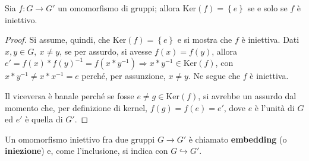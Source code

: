 \documentclass[11pt, a4paper]{scrartcl}
\theoremstyle{definition}
\numberwithin{esempio}{section}
\theoremstyle{definition}
\numberwithin{obs}{section}
\numberwithin{nota}{section}
\numberwithin{equation}{subsection}
\begin{document}
\begin{prop}
	{}{}
	Sia $f : G\to G'$ un omomorfismo di gruppi; allora $\mathrm{Ker} (f) = \left\{ e \right\} $ se e solo se $f$ \`e iniettivo.
	\begin{proof}
		Si assume, quindi, che $\mathrm{Ker} (f) = \left\{ e \right\} $ e si mostra che $f$ \`e iniettiva. Dati $x,y \in G, \ x\neq y$, se per assurdo, si avesse $f(x) = f(y)$, allora $ e'=  f(x) * f(y)^{-1} = f(x * y^{-1} )\Rightarrow x*y^{-1}  \in \mathrm{Ker} (f)$, con $x*y^{-1}  \neq x * x^{-1} = e$ perch\'e, per assunzione, $x \neq y$.
		Ne segue che $f$ \`e iniettiva.

		Il viceversa \`e banale perch\'e se fosse $e\neq g \in \mathrm{Ker} (f)$, si avrebbe un assurdo dal momento che, per definizione di kernel, $f(g) = f(e) = e'$, dove $e$ \`e l'unit\`a di $G$ ed $e'$ \`e quella di $G'$.
	\end{proof}
\end{prop}
\noindent Un omomorfismo iniettivo fra due gruppi $G\to G'$ \`e chiamato \textbf{embedding} (o \textbf{iniezione}) e, come l'inclusione, si indica con $G \hookrightarrow G'$.
\end{document}
